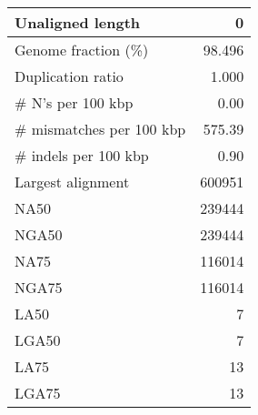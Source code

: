\documentclass[12pt,a4paper]{article}
\begin{document}
\begin{table}[ht]
\begin{center}
\begin{tabular}{|l*{1}{|r}|}
Unaligned length & 0 \\ \hline
Genome fraction (\%) & 98.496 \\ \hline
Duplication ratio & 1.000 \\ \hline
\# N's per 100 kbp & 0.00 \\ \hline
\# mismatches per 100 kbp & 575.39 \\ \hline
\# indels per 100 kbp & 0.90 \\ \hline
Largest alignment & 600951 \\ \hline
NA50 & 239444 \\ \hline
NGA50 & 239444 \\ \hline
NA75 & 116014 \\ \hline
NGA75 & 116014 \\ \hline
LA50 & 7 \\ \hline
LGA50 & 7 \\ \hline
LA75 & 13 \\ \hline
LGA75 & 13 \\ \hline
\end{tabular}
\end{center}
\end{table}
\end{document}

